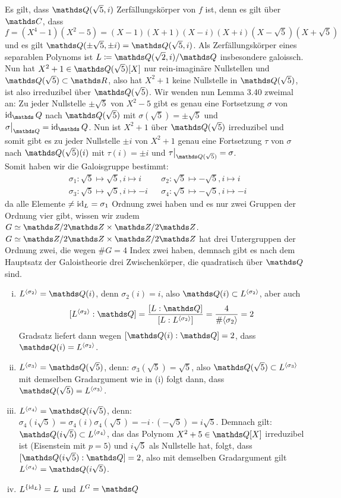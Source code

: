 Es gilt, dass $\Q(\sqrt{5},i)$ Zerfällungskörper von $f$ ist, denn es gilt über $\C$, dass
\[
f=(X^4-1)(X^2-5)=(X-1)(X+1)(X-i)(X+i)(X-\sqrt{5})(X+\sqrt{5})    
\]
und es gilt $\Q(\pm\sqrt{5},\pm i)=\Q(\sqrt{5},i)$. Als Zerfällungskörper eines separablen Polynoms ist $L\coloneqq \Q(\sqrt{2},i)/\Q$ insbesondere galoissch. \\ 
Nun hat $X^2+1\in \Q(\sqrt{5})[X]$ nur rein-imaginäre Nullstellen und $\Q(\sqrt{5})\subset \R$, also hat $X^2+1$ keine Nullstelle in $\Q(\sqrt{5})$, ist also irreduzibel über $\Q(\sqrt{5})$. Wir wenden nun Lemma 3.40 zweimal an: Zu jeder Nullstelle $\pm \sqrt{5}$ von $X^2-5$ gibt es genau eine Fortsetzung $\sigma$ von $\id_\Q$ nach $\Q(\sqrt{5})$ mit $\sigma(\sqrt{5})=\pm \sqrt{5}$ und $\restr{\sigma}{\Q}=\id_\Q$. Nun 
ist $X^2+1$ über $\Q(\sqrt{5})$ irreduzibel und somit gibt es zu jeder Nullstelle $\pm i$ von $X^2+1$ genau eine Fortsetzung $\tau$ von $\sigma$ nach $\Q(\sqrt{5})(i)$ mit $\tau(i)=\pm i$ und $\restr{\tau}{\Q(\sqrt{5})}=\sigma$. \\
Somit haben wir die Galoisgruppe bestimmt:
\begin{align*}
    &\sigma_1: \sqrt{5}\mapsto \sqrt{5}, i\mapsto i && \sigma_2: \sqrt{5}\mapsto -\sqrt{5}, i \mapsto i \\
    &\sigma_3: \sqrt{5}\mapsto \sqrt{5}, i\mapsto -i && \sigma_4:\sqrt{5}\mapsto -\sqrt{5}, i \mapsto -i
\end{align*}
da alle Elemente $\neq \operatorname{id}_L=\sigma_1$ Ordnung zwei haben und es nur zwei Gruppen der Ordnung vier gibt, wissen wir zudem $G\simeq \Z/2\Z\times \Z/2\Z$. \\
$G\simeq \Z/2\Z\times \Z/2\Z$ hat drei Untergruppen der Ordnung zwei, die wegen $\#G=4$ Index zwei haben, demnach gibt es nach dem Hauptsatz der Galoistheorie drei Zwischenkörper, die quadratisch über $\Q$ sind. 
\begin{enumerate}[(i)]
    \item $L^{\langle \sigma_2\rangle}=\Q(i)$, denn $\sigma_2(i)=i$, also $\Q(i)\subset L^{\langle \sigma_2\rangle}$, aber auch 
    \[
        [L^{\langle \sigma_2\rangle}:\Q]=\frac{[L:\Q]}{[L:L^{\langle \sigma_2\rangle}]}=\frac{4}{\#\langle \sigma_2\rangle}=2    
    \] 
    Gradsatz liefert dann wegen $[\Q(i):\Q]=2$, dass $\Q(i)=L^{\langle \sigma_2\rangle}$.
    \item $L^{\langle \sigma_3\rangle}=\Q(\sqrt{5})$, denn: $\sigma_3(\sqrt{5})=\sqrt{5}$, also $\Q(\sqrt{5})\subset L^{\langle \sigma_3\rangle}$ mit demselben Gradargument wie in (i) folgt dann, dass $\Q(\sqrt{5})=L^{\langle \sigma_3\rangle}$.
    \item $L^{\langle \sigma_4\rangle}=\Q(i\sqrt{5})$, denn: $\sigma_4(i\sqrt{5})=\sigma_4(i)\sigma_4(\sqrt{5})=-i\cdot (-\sqrt{5})=i\sqrt{5}$. Demnach gilt: $\Q(i\sqrt{5})\subset L^{\langle \sigma_4\rangle}$, das das Polynom $X^2+5\in \Q[X]$ irreduzibel ist (Eisenstein mit $p=5$) und $i\sqrt{5}$ als Nullstelle hat, folgt, dass $[\Q(i\sqrt{5}):\Q]=2$, also mit demselben Gradargument gilt $L^{\langle \sigma_4\rangle}=\Q(i\sqrt{5})$.
    \item $L^{\{\operatorname{id}_L\}}=L$ und $L^G = \Q$
\end{enumerate} 
